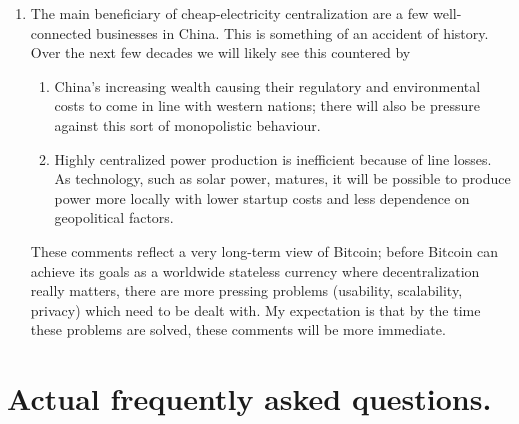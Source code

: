 \documentclass[letterpaper]{article}
\theoremstyle{xxx}
\theoremstyle{evil}
\theoremstyle{yyy}
\theoremstyle{plain}
\theoremstyle{zzz}
\begin{document}
\begin{enumerate}
\begin{enumerate}
\item The main beneficiary of cheap-electricity centralization are a few well-connected
businesses in China. This is something of an accident of history. Over the next few
decades we will likely see this countered by
\begin{enumerate}
\item China's increasing wealth causing their regulatory and environmental costs
to come in line with western nations; there will also be pressure against this
sort of monopolistic behaviour.
\item Highly centralized power production is inefficient because of line losses.
As technology, such as solar power, matures, it will be possible to produce power
more locally with lower startup costs and less dependence on geopolitical factors.
\end{enumerate}
These comments reflect a very long-term view of Bitcoin; before Bitcoin can
achieve its goals as a worldwide stateless currency where decentralization really
matters, there are more pressing problems (usability, scalability, privacy)
which need to be dealt with. My expectation is that by the time these problems are
solved, these comments will be more immediate.
\end{enumerate}


\end{enumerate}

\section{Actual frequently asked questions.}
\end{document}
